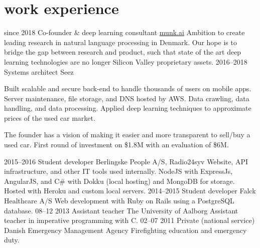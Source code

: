 \documentclass[]{friggeri-cv}
\begin{document}
\section{work experience}

\begin{entrylist}
  \entry
    {since 2018}
    {Co-founder \& deep learning consultant}
    {\href{http://www.munk.ai/}{munk.ai}}
    {
      Ambition to create leading research in natural language processing in Denmark.
      Our hope is to bridge the gap between research and product, such that state of the art deep learning technologies are no longer Silicon Valley proprietary assets.
    }
  \entry
    {2016--2018}
    {Systems architect}
    {Seez}
    {
      Built scalable and secure back-end to handle thousands of users on mobile apps.
      Server maintenance, file storage, and DNS hosted by AWS.
      Data crawling, data handling, and data processing.
      Applied deep learning techniques to approximate prices of the used car market.
    
      The founder has a vision of making it easier and more transparent to sell/buy a used car.
      First round of investment on \$1.8M with an evaluation of \$6M.    
	  }
  \entry
    {2015--2016}
    {Student developer}
    {Berlingske People A/S, Radio24syv}
    {
      Website, API infrastructure, and other IT tools used internally. 
      NodeJS with ExpressJs, AngularJS, and C\# with Dokku (local hosting) and MongoDB for storage.
      Hosted with Heroku and custom local servers.
    }
  \entry
    {2014--2015}
    {Student developer}
    {Falck Healthcare A/S}
    {
      Web development with Ruby on Rails using a PostgreSQL database.
    }
  \entry
    {08–12 2013}
    {Assistant teacher}
    {The University of Aalborg}
    {Assistant teacher in imperative programming with C.}
  \entry
    {02–07 2011}
    {Private (national service)}
    {Danish Emergency Management Agency}
    {Firefighting education and emergency duty.}
\end{entrylist}
\end{document}
